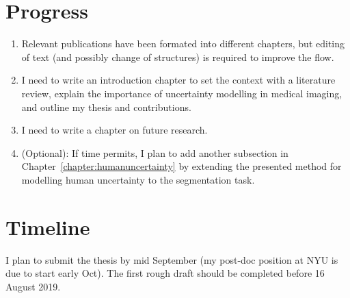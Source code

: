 


\section*{Progress}
\begin{enumerate}
	\item Relevant publications have been formated into different chapters, but editing of text (and possibly change of structures) is required to improve the flow. 
	\item I need to write an introduction chapter to set the context with a literature review, explain the importance of uncertainty modelling in medical imaging, and outline my thesis and contributions. 
	\item I need to write a chapter on future research. 
	\item (Optional): If time permits, I plan to add another subsection in Chapter~\ref{chapter:humanuncertainty} by extending the presented method for modelling human uncertainty to the segmentation task.		
\end{enumerate}

\section*{Timeline}
I plan to submit the thesis by mid September (my post-doc position at NYU is due to start early Oct). The first rough draft should be completed before 16 August 2019. 

